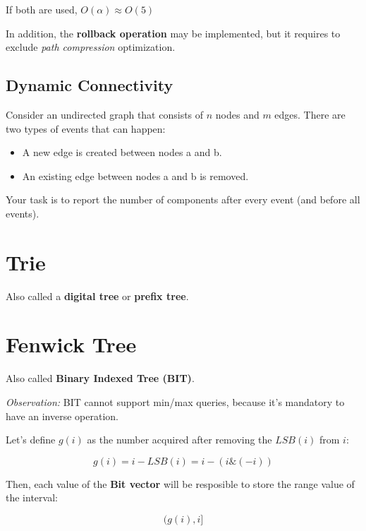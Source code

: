     If both are used, $O(\alpha) \approx O(5)$

    In addition, the \textbf{rollback operation} may be implemented, but it requires to exclude \textit{path compression} optimization.


    \subsection{Dynamic Connectivity}

    Consider an undirected graph that consists of $n$ nodes and $m$ edges. There are two types of events that can happen:

    \begin{itemize}
    \item A new edge is created between nodes a and b.
    \item An existing edge between nodes a and b is removed.
    \end{itemize}
    
    Your task is to report the number of components after every event (and before all events).


\section{Trie}

    Also called a \textbf{digital tree} or \textbf{prefix tree}.
    

\section{Fenwick Tree}

    Also called \textbf{Binary Indexed Tree (BIT)}.

    \textit{Observation:} BIT cannot support min/max queries, because it's mandatory to have an inverse operation.

    Let's define $g(i)$ as the number acquired after removing the $LSB(i)$ from $i$:

        $$ g(i) = i - LSB(i) = i - (i \& (-i)) $$

    Then, each value of the \textbf{Bit vector} will be resposible to store the range value of the interval:

        $$ (g(i), i] $$

